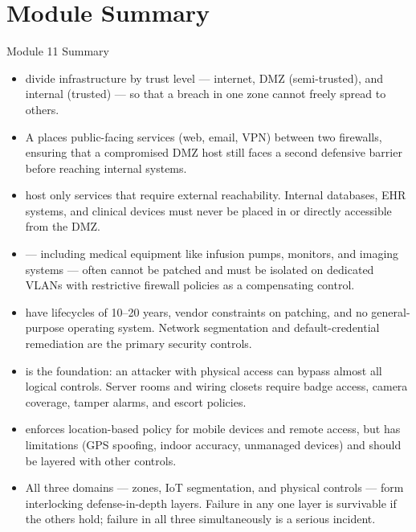 \documentclass[aspectratio=169]{beamer}  %
\begin{document}
\section*{Module Summary}

\begin{frame}[t,allowframebreaks]{Module 11 Summary}
    \small
    \begin{itemize}
        \item {} divide infrastructure by trust level --- internet, DMZ (semi-trusted), and internal (trusted) --- so that a breach in one zone cannot freely spread to others.
        \item A  places public-facing services (web, email, VPN) between two firewalls, ensuring that a compromised DMZ host still faces a second defensive barrier before reaching internal systems.
        \item {} host only services that require external reachability. Internal databases, EHR systems, and clinical devices must never be placed in or directly accessible from the DMZ.
        \item {} --- including medical equipment like infusion pumps, monitors, and imaging systems --- often cannot be patched and must be isolated on dedicated VLANs with restrictive firewall policies as a compensating control.
        \item {} have lifecycles of 10--20 years, vendor constraints on patching, and no general-purpose operating system. Network segmentation and default-credential remediation are the primary security controls.
        \item {} is the foundation: an attacker with physical access can bypass almost all logical controls. Server rooms and wiring closets require badge access, camera coverage, tamper alarms, and escort policies.
        \item {} enforces location-based policy for mobile devices and remote access, but has limitations (GPS spoofing, indoor accuracy, unmanaged devices) and should be layered with other controls.
        \item All three domains --- zones, IoT segmentation, and physical controls --- form interlocking defense-in-depth layers. Failure in any one layer is survivable if the others hold; failure in all three simultaneously is a serious incident.
    \end{itemize}
\end{frame}
\end{document}
